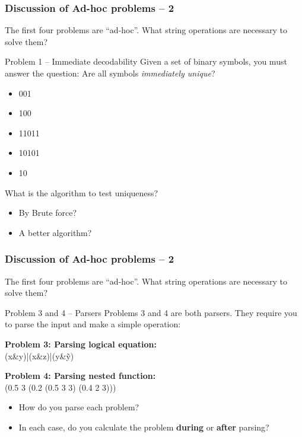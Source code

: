 \documentclass{beamer}
\begin{document}
\begin{frame}
  \frametitle{Discussion of Ad-hoc problems -- 2}

  {\smaller
    \begin{block}{}
      The first four problems are ``ad-hoc''. What string operations
      are necessary to solve them?
    \end{block}

    \begin{exampleblock}{Problem 1 -- Immediate decodability}
      Given a set of binary symbols, you must answer the question:
      Are all symbols \emph{immediately unique}?

      \begin{itemize}
      \item 001
      \item 100
      \item 11011
      \item 10101
      \item \alert{10}
      \end{itemize}
    \end{exampleblock}

    \vfill
    
    What is the algorithm to test uniqueness?
    \begin{itemize}
    \item By Brute force?
    \item A better algorithm?
    \end{itemize}
  }
\end{frame}

\begin{frame}
  \frametitle{Discussion of Ad-hoc problems -- 2}

  {\smaller
    \begin{block}{}
      The first four problems are ``ad-hoc''. What string operations
      are necessary to solve them?
    \end{block}

    \begin{exampleblock}{Problem 3 and 4 -- Parsers}
      Problems 3 and 4 are both parsers. They require you to parse the
      input and make a simple operation:

      \medskip
      
      {\bf Problem 3: Parsing logical equation:}\\
      (x\&y)|(x\&z)|(y\&\~ y)

      \medskip

      {\bf Problem 4: Parsing nested function:}\\
      (0.5 3 (0.2 (0.5 3 3) (0.4 2 3)))
    \end{exampleblock}

    \begin{itemize}
    \item How do you parse each problem?
    \item In each case, do you calculate the problem {\bf during} or {\bf after}
      parsing?
    \end{itemize}
  }
\end{frame}
\end{document}
